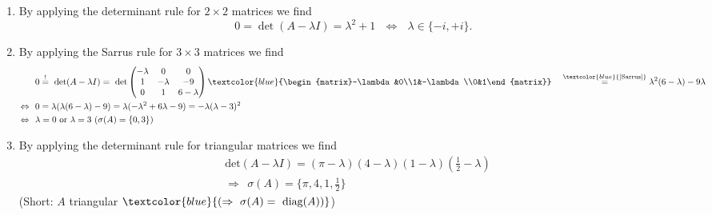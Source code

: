 {\color{solution}
\begin{enumerate}
	\item By applying the determinant rule for $2\times2$ matrices we find $$0 = \det(A-\lambda I) = \lambda^2 +1 ~~~\Leftrightarrow ~~~ \lambda \in \{-i, +i\}.$$
	\item By applying the Sarrus rule for $3\times3$ matrices we find \begin{align*}
	&0\stackrel{!}{=}~\text{det}(A-\lambda I)
	=~\text{det}\begin{pmatrix}-\lambda&0&0\\1&-\lambda&-9\\0&1&6-\lambda\end{pmatrix}\textcolor{blue}{\begin{matrix}-\lambda&0\\1&-\lambda\\0&1\end{matrix}}~~~\stackrel{\textcolor{blue}{\text{[Sarrus]}}}{=}
	\lambda^2(6-\lambda)-9\lambda\\
	\Leftrightarrow~~&0
	=\lambda(\lambda(6-\lambda)-9)
	=\lambda(-\lambda^2+6\lambda-9)
	=-\lambda(\lambda-3)^2\\
	\Leftrightarrow~~&\lambda 
	= 0~\text{or}~\lambda
	=3~(\sigma(A)=\{0,3\})
	\end{align*}
		\item By applying the determinant rule for triangular matrices we find
	\begin{align*}
	&\text{det}(A-\lambda I)=(\pi-\lambda)(4-\lambda)(1-\lambda)\left(\frac{1}{2}-\lambda\right)\\
	&\Rightarrow~~\sigma(A)=\{\pi,4,1,\frac{1}{2}\}~~
	\end{align*}
	(Short: 	$A$ triangular  $\textcolor{blue}{(\Rightarrow~\sigma(A)=~\text{diag}(A))}$)
\end{enumerate}
}
